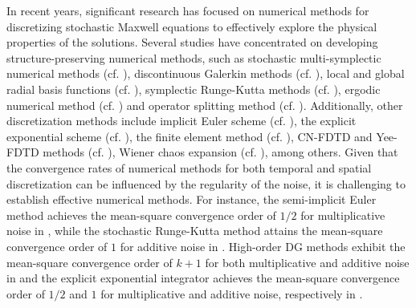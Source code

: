 \documentclass[preprint,12pt]{elsarticle}
\begin{document}
	In recent years, significant research has focused on numerical methods for discretizing stochastic Maxwell equations to effectively explore the physical properties of the solutions. Several studies have concentrated on developing structure-preserving numerical methods, such as stochastic multi-symplectic numerical methods (cf. \citep{Hongetal2014,Chenetal2016,Hongetal2017,Zhangetal2019a}),  discontinuous Galerkin methods (cf. \citep{Chen2021,Sunetal2022,Sunetal2023}), local and global radial basis functions (cf. \citep{Hongetal2022,Hou2023}),  symplectic Runge-Kutta methods  (cf. \citep{Chenetal2019a}), ergodic numerical
	method (cf. \citep{Chenetal2022}) and operator splitting method (cf. \citep{Chenetal2021}). Additionally, other discretization methods include implicit Euler scheme (cf. \citep{Chenetal2019b}), the explicit exponential scheme (cf. \citep{Cohenetal2020}), the finite element method (cf. \citep{Zhang2008}), CN-FDTD and Yee-FDTD methods   (cf. \citep{ZhouLiang2024}), Wiener chaos expansion (cf. \citep{Badieirostamietal2010}), among others. Given that the convergence rates of numerical methods for both temporal and spatial discretization can be influenced by the regularity of the noise, it is challenging to establish effective numerical methods. For instance, the semi-implicit Euler method achieves the mean-square convergence order of \(1/2\) for multiplicative noise in \citep{Chenetal2019b}, while the stochastic Runge-Kutta method attains the mean-square convergence order of \(1\) for additive noise in \citep{Chenetal2019a}. High-order DG methods exhibit the mean-square convergence order of \(k+1\) for both multiplicative and additive noise in \citep{Sunetal2022, Sunetal2023} and the explicit exponential integrator achieves the mean-square convergence order  of \(1/2\) and \(1\) for multiplicative and additive noise, respectively in \citep{Cohenetal2020}. 
	
\end{document}
